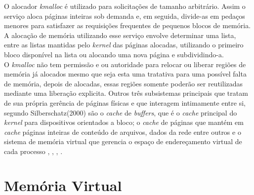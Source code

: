 O alocador \emph{kmalloc} é utilizado para solicitações de tamanho arbitrário. Assim o serviço aloca páginas inteiras sob demanda e, em seguida, divide-as em pedaços menores para satisfazer as requisições frequentes de pequenos blocos de memória. A alocação de memória utilizando esse serviço envolve determinar uma lista, entre as listas mantidas pelo \emph{kernel} das páginas alocadas, utilizando o primeiro bloco disponível na lista ou alocando uma nova página e subdividindo-a.\\ O \emph{kmalloc} não tem permissão e ou autoridade para relocar ou liberar regiões de memória já alocados mesmo que seja esta uma tratativa para uma possível falta de memória, depois de alocadas, essas regiões somente poderão ser reutilizadas mediante uma liberação explicita. Outros três subsistemas principais que tratam de sua própria gerência de páginas físicas e que interagem intimamente entre si, segundo Silberschatz(2000) são o \emph{cache} de \emph{buffers}, que é o \emph{cache} principal do \emph{kernel} para dispositivos orientados a bloco; o \emph{cache} de páginas que mantém em \emph{cache} páginas inteiras de conteúdo de arquivos, dados da rede entre outros e o sistema de memória virtual que gerencia o espaço de endereçamento virtual de cada processo \cite{Tanenbaum2016}, \cite{ufscar2019}, \cite{silberschatz2000}, \cite{stallings2004}.

\section{Memória Virtual}

